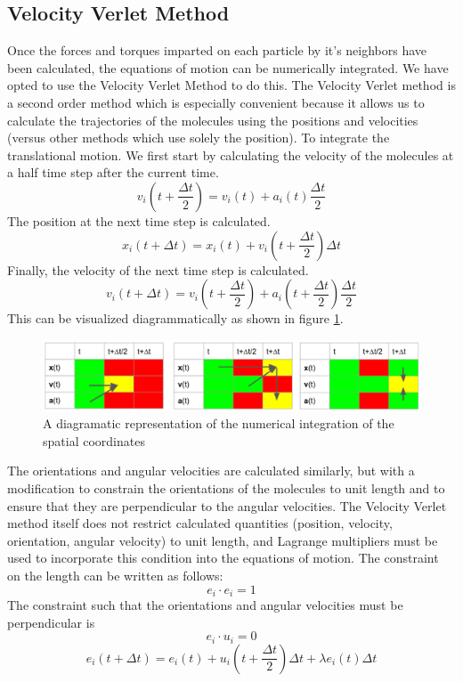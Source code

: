 \documentclass[preprint, aps]{revtex4-1}
\begin{document}
\subsection*{Velocity Verlet Method}
Once the forces and torques imparted on each particle by it's neighbors have
been calculated, the equations of motion can be numerically integrated. We have
opted to use the Velocity Verlet Method to do this. The Velocity Verlet method
is a second order method which is especially convenient because it allows us to
calculate the trajectories of the molecules using the positions and velocities
(versus other methods which use solely the position). To integrate the
translational motion. We first start by calculating the velocity of the
molecules at a half time step after the current time. 
	\begin{equation} \label{vv-v1}
		v_i(t+\frac{\Delta t}{2}) 
		= v_i(t) + a_i(t)\frac{\Delta t}{2}
	\end{equation}
The position at the next time step is calculated.
	\begin{equation} \label{vv-x}
		x_i(t+\Delta t) 
		= x_i(t) + v_i(t+\frac{\Delta t}{2})\Delta t
	\end{equation}
Finally, the velocity of the next time step is calculated.
	\begin{equation} \label{vv-v2}
		v_i(t+\Delta t) 
		= v_i(t + \frac{\Delta t}{2}) 
		+ a_i(t + \frac{\Delta t}{2})\frac{\Delta t}{2}
	\end{equation}
This can be visualized diagrammatically as shown in figure \ref{fig:vv}.
	\begin{figure}
		\includegraphics[width=\textwidth]{vv.png}
		\caption{A diagramatic representation of the numerical integration of
			the spatial coordinates}
		\label{fig:vv}
	\end{figure}

The orientations and angular velocities are calculated similarly, but with a
modification to constrain the orientations of the molecules to unit length and
to ensure that they are perpendicular to the angular velocities. The Velocity 
Verlet method itself does not restrict calculated quantities (position, 
velocity, orientation, angular velocity) to unit length, and Lagrange 
multipliers must be used to incorporate this condition into the equations of
motion. The constraint on the length can be written as follows:
	\begin{equation} \label{unit-length}
		e_i \cdot e_i = 1
	\end{equation}
The constraint such that the orientations and angular velocities must be
perpendicular is
	\begin{equation} \label{eu-perp}
		e_i \cdot u_i = 0
	\end{equation}
	\begin{equation} \label{vv-e}
		e_i(t+\Delta t) 
		= e_i(t) 
		+ u_i(t + \frac{\Delta t}{2})\Delta t 
		+ \lambda e_i(t) \Delta t
	\end{equation}
\end{document}
